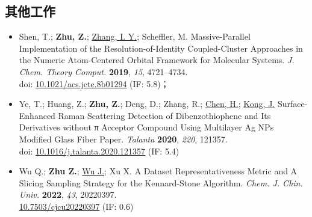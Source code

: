 \subsection*{其他工作}

\begin{itemize}[nosep]
    \item Shen, T.; \textbf{Zhu, Z.}; \underline{Zhang, I. Y.}; Scheffler, M. Massive-Parallel Implementation of the Resolution-of-Identity Coupled-Cluster Approaches in the Numeric Atom-Centered Orbital Framework for Molecular Systems. \textit{J. Chem. Theory Comput.} \textbf{2019}, \textit{15}, 4721–4734. \\
    doi: \href{https://doi.org/10.1021/acs.jctc.8b01294}{10.1021/acs.jctc.8b01294}
    (IF: 5.8)；
    \item Ye, T.; Huang, Z.; \textbf{Zhu, Z.}; Deng, D.; Zhang, R.; \underline{Chen, H.}; \underline{Kong, J.} Surface-Enhanced Raman Scattering Detection of Dibenzothiophene and Its Derivatives without π Acceptor Compound Using Multilayer Ag NPs Modified Glass Fiber Paper. \textit{Talanta} \textbf{2020}, \textit{220}, 121357. \\
    doi: \href{https://doi.org/10.1016/j.talanta.2020.121357}{10.1016/j.talanta.2020.121357}
    (IF: 5.4)
    \item Wu Q.; \textbf{Zhu Z.}; \underline{Wu J.}; Xu X. A Dataset Representativeness Metric and A Slicing Sampling Strategy for the Kennard-Stone Algorithm. \textit{Chem. J. Chin. Univ.} \textbf{2022}, \textit{43}, 20220397. \\
    \href{https://doi.org/10.7503/cjcu20220397}{10.7503/cjcu20220397}
    (IF: 0.6)
\end{itemize}



